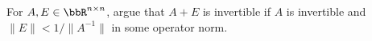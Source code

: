 \documentclass[12pt, leqno]{article}
\begin{document}

For $A, E \in \bbR^{n \times n}$, argue that $A+E$ is invertible if $A$ is
invertible and $\|E\| < 1/\|A^{-1}\|$ in some operator norm.
\end{document}
